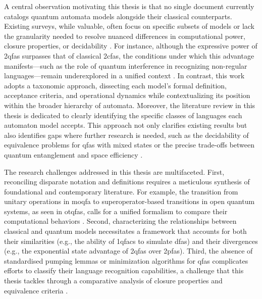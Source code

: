 A central observation motivating this thesis is that no single document currently catalogs quantum automata models alongside their classical counterparts. Existing surveys, while valuable, often focus on specific subsets of models or lack the granularity needed to resolve nuanced differences in computational power, closure properties, or decidability \cite{gruska2012quantum}. For instance, although the expressive power of \glspl{2qfa} surpasses that of classical \glspl{2cfa}, the conditions under which this advantage manifests—such as the role of quantum interference in recognizing non-regular languages—remain underexplored in a unified context \cite{yakaryilmaz2010succinctness}. In contrast, this work adopts a taxonomic approach, dissecting each model’s formal definition, acceptance criteria, and operational dynamics while contextualizing its position within the broader hierarchy of automata. Moreover, the literature review in this thesis is dedicated to clearly identifying the specific classes of languages each automaton model accepts. This approach not only clarifies existing results but also identifies gaps where further research is needed, such as the decidability of equivalence problems for \glspl{qfa} with mixed states or the precise trade-offs between quantum entanglement and space efficiency \cite{hirvensalo2012quantum}.  

The research challenges addressed in this thesis are multifaceted. First, reconciling disparate notation and definitions requires a meticulous synthesis of foundational and contemporary literature. For example, the transition from unitary operations in \gls{moqfa} to superoperator-based transitions in open quantum systems, as seen in \glspl{otqfa}, calls for a unified formalism to compare their computational behaviors \cite{bertoni2001quantum, breuer2002theory}. Second, characterizing the relationships between classical and quantum models necessitates a framework that accounts for both their similarities (e.g., the ability of \glspl{1qfac} to simulate \glspl{dfa}) and their divergences (e.g., the exponential state advantage of \glspl{2qfa} over \glspl{2pfa}). Third, the absence of standardised pumping lemmas or minimization algorithms for \glspl{qfa} complicates efforts to classify their language recognition capabilities, a challenge that this thesis tackles through a comparative analysis of closure properties and equivalence criteria \cite{yakaryilmaz2014quantum}.


